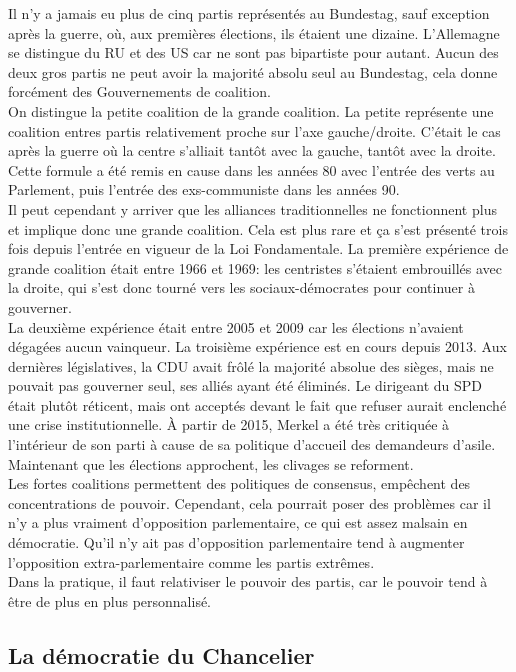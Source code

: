 \documentclass[10pt, a4paper, openany]{book}
\begin{document}
Il n'y a jamais eu plus de cinq partis représentés au Bundestag, sauf exception après la guerre, où, aux premières élections, ils étaient une dizaine. L'Allemagne se distingue du RU et des US car ne sont pas bipartiste pour autant. Aucun des deux gros partis ne peut avoir la majorité absolu seul au Bundestag, cela donne forcément des Gouvernements de coalition. \\
On distingue la petite coalition de la grande coalition. La petite représente une coalition entres partis relativement proche sur l'axe gauche/droite. C'était le cas après la guerre où la centre s'alliait tantôt avec la gauche, tantôt avec la droite. Cette formule a été remis en cause dans les années 80 avec l'entrée des verts au Parlement, puis l'entrée des exs-communiste dans les années 90. \\
Il peut cependant y arriver que les alliances traditionnelles ne fonctionnent plus et implique donc une grande coalition. Cela est plus rare et ça s'est présenté trois fois depuis l'entrée en vigueur de la Loi Fondamentale. La première expérience de grande coalition était entre 1966 et 1969: les centristes s'étaient embrouillés avec la droite, qui s'est donc tourné vers les sociaux-démocrates pour continuer à gouverner. \\
La deuxième expérience était entre 2005 et 2009 car les élections n'avaient dégagées aucun vainqueur. La troisième expérience est en cours depuis 2013. Aux dernières législatives, la CDU avait frôlé la majorité absolue des sièges, mais ne pouvait pas gouverner seul, ses alliés ayant été éliminés. Le dirigeant du SPD était plutôt réticent, mais ont acceptés devant le fait que refuser aurait enclenché une crise institutionnelle. À partir de 2015, Merkel a été très critiquée à l'intérieur de son parti à cause de sa politique d'accueil des demandeurs d'asile. Maintenant que les élections approchent, les clivages se reforment. \\
Les fortes coalitions permettent des politiques de consensus, empêchent des concentrations de pouvoir. Cependant, cela pourrait poser des problèmes car il n'y a plus vraiment d'opposition parlementaire, ce qui est assez malsain en démocratie. Qu'il n'y ait pas d'opposition parlementaire tend à augmenter l'opposition extra-parlementaire comme les partis extrêmes. \\
Dans la pratique, il faut relativiser le pouvoir des partis, car le pouvoir tend à être de plus en plus personnalisé. 

\subsection{La démocratie du Chancelier} 
\end{document}

